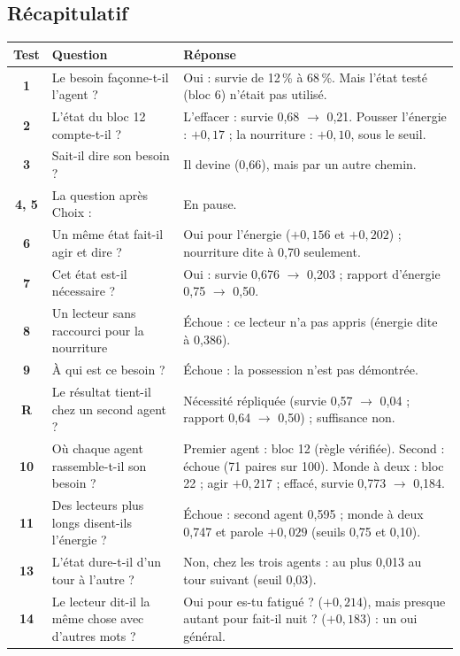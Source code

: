 \documentclass[fontsize=10pt,paper=a4,parskip=half-]{scrartcl}
\newcommand{\q}[1]{\og #1\fg{}}
\newcommand{\pc}{\,\%}
\begin{document}
\subsection{Récapitulatif}
\begin{center}
\footnotesize
\renewcommand{\arraystretch}{1.08}
\begin{tabularx}{\linewidth}{>{\sffamily\bfseries\color{accent}}c >{\raggedright\arraybackslash}p{4.6cm} >{\raggedright\arraybackslash}X}
\toprule
\normalfont\textsf{\textbf{Test}} & \textsf{\textbf{Question}} & \textsf{\textbf{Réponse}}\\
\midrule
1 & Le besoin façonne-t-il l'agent ? & Oui : survie de 12\pc{} à 68\pc. Mais l'état testé (bloc 6) n'était pas utilisé.\\
2 & L'état du bloc 12 compte-t-il ? & L'effacer : survie 0,68 $\to$ 0,21. Pousser l'énergie : $+0,17$ ; la nourriture : $+0,10$, sous le seuil.\\
3 & Sait-il dire son besoin ? & Il devine (0,66), mais par un autre chemin.\\
4, 5 & La question après \q{Choix :} & En pause.\\
6 & Un même état fait-il agir et dire ? & Oui pour l'énergie ($+0,156$ et $+0,202$) ; nourriture dite à 0,70 seulement.\\
7 & Cet état est-il nécessaire ? & Oui : survie 0,676 $\to$ 0,203 ; rapport d'énergie 0,75 $\to$ 0,50.\\
8 & Un lecteur sans raccourci pour la nourriture & Échoue : ce lecteur n'a pas appris (énergie dite à 0,386).\\
9 & À qui est ce besoin ? & Échoue : la possession n'est pas démontrée.\\
R & Le résultat tient-il chez un second agent ? & Nécessité répliquée (survie 0,57 $\to$ 0,04 ; rapport 0,64 $\to$ 0,50) ; suffisance non.\\
10 & Où chaque agent rassemble-t-il son besoin ? & Premier agent : bloc 12 (règle vérifiée). Second : échoue (71 paires sur 100). Monde à deux : bloc 22 ; agir $+0,217$ ; effacé, survie 0,773 $\to$ 0,184.\\
11 & Des lecteurs plus longs disent-ils l'énergie ? & Échoue : second agent 0,595 ; monde à deux 0,747 et parole $+0,029$ (seuils 0,75 et 0,10).\\
13 & L'état dure-t-il d'un tour à l'autre ? & Non, chez les trois agents : au plus 0,013 au tour suivant (seuil 0,03).\\
14 & Le lecteur dit-il la même chose avec d'autres mots ? & Oui pour \q{es-tu fatigué ?} ($+0,214$), mais presque autant pour \q{fait-il nuit ?} ($+0,183$) : un \q{oui} général.\\

\end{tabularx}
\end{center}
\end{document}

